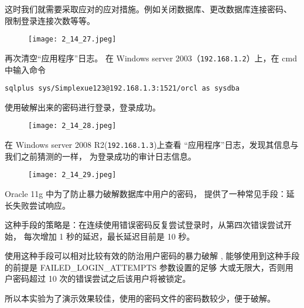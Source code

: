 这时我们就需要采取应对的应对措施。例如关闭数据库、更改数据库连接密码、
限制登录连接次数等等。
\begin{figure}[H]
  \begin{center}
    \texttt{[image: 2\_14\_27.jpeg]}
  \end{center}
\end{figure}

再次清空``应用程序''日志。
在 Windows server 2003（\texttt{192.168.1.2}）上，在 cmd 中输入命令
\begin{verbatim}
sqlplus sys/Simplexue123@192.168.1.3:1521/orcl as sysdba
\end{verbatim}
使用破解出来的密码进行登录，登录成功。
\begin{figure}[H]
  \begin{center}
    \texttt{[image: 2\_14\_28.jpeg]}
  \end{center}
\end{figure}

在 Windows server 2008 R2(\texttt{192.168.1.3})上查看
``应用程序''日志，发现其信息与我们之前猜测的一样，
为登录成功的审计日志信息。
\begin{figure}[H]
  \begin{center}
    \texttt{[image: 2\_14\_29.jpeg]}
  \end{center}
\end{figure}

Oracle 11g 中为了防止暴力破解数据库中用户的密码，
提供了一种常见手段：延长失败尝试响应。

这种手段的策略是：在连续使用错误密码反复尝试登录时，从第四次错误尝试开始，
每次增加 1 秒的延迟，最长延迟目前是 10 秒。

使用这种手段可以相对比较有效的防治用户密码的暴力破解
, 能够使用到这种手段的前提是 FAILED\_LOGIN\_ATTEMPTS 参数设置的足够
大或无限大，否则用户密码超过 10 次的错误尝试之后该用户将被锁定。

所以本实验为了演示效果较佳，使用的密码文件的密码数较少，便于破解。
